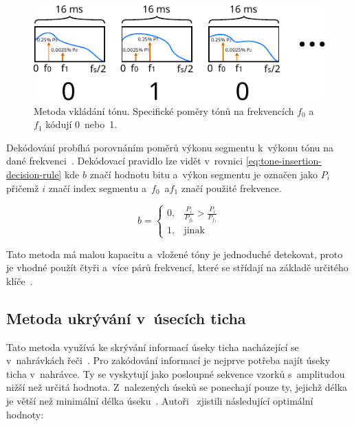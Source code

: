 \begin{figure}[hbt]
    \centering
    \includegraphics[width=\textwidth]{obrazky/tone-insertion-diagram.pdf}
    \caption{Metoda vkládání tónu. Specifické poměry tónů na frekvencích $f_0$
    a~$f_1$ kódují 0~nebo~1.}
    \label{pic:tone-insertion}
\end{figure}

Dekódování probíhá porovnáním poměrů výkonu segmentu k~výkonu tónu na dané
frekvenci~\cite{Djebbar2012}. Dekódovací pravidlo lze vidět v~rovnici
\ref{eq:tone-insertion-decision-rule} kde $b$ značí hodnotu bitu a~výkon
segmentu je označen jako $P_i$ přičemž $i$ značí index segmentu a~$f_0$~a$f_1$
značí použité frekvence.

\begin{equation}
    \label{eq:tone-insertion-decision-rule}
    b = \left\{
        \begin{array}{rl}
            0, & \frac{P_i}{P_{f_0}} > \frac{P_i}{P_{f_1}} \\
            1, & \mathrm{jinak}
        \end{array}
    \right.
\end{equation}

Tato metoda má malou kapacitu a~vložené tóny je jednoduché detekovat, proto je
vhodné použít čtyři a~více párů frekvencí, které se střídají na základě
určitého klíče~\cite{Djebbar2012}.

\subsection*{Metoda ukrývání v~úsecích ticha}
\label{sub:hiding-in-silence-intervals}

Tato metoda využívá ke skrývání informací úseky ticha nacházející se
v~nahrávkách řeči~\cite{Djebbar2012}. Pro zakódování informací je nejprve
potřeba najít úseky ticha v~nahrávce. Ty se vyskytují jako posloupné sekvence
vzorků s~amplitudou nižší než určitá hodnota. Z~nalezených úseků se ponechají
pouze ty, jejichž délka je větší než minimální délka úseku~\cite{Shahreza2008}.
Autoři~\cite{Shahreza2008} zjistili následující optimální hodnoty:

